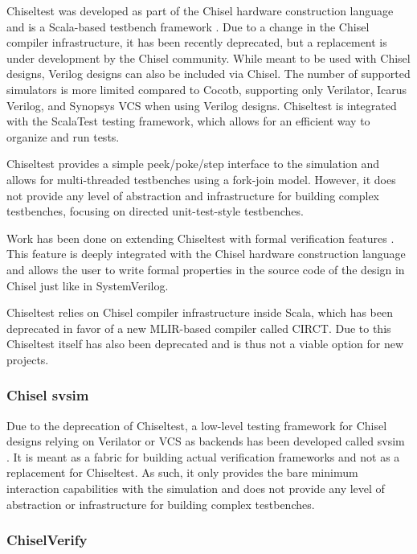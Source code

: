 Chiseltest was developed as part of the Chisel hardware construction language \cite{chiselpaper} and is a Scala-based testbench
framework \cite{chiseltest}. Due to a change in the Chisel compiler infrastructure, it has been recently deprecated,
but a replacement is under development by the Chisel community. While meant to be used with Chisel designs, Verilog
designs can also be included via Chisel. The number of supported simulators is more limited compared to Cocotb,
supporting only Verilator, Icarus Verilog, and Synopsys VCS when using Verilog designs. Chiseltest is integrated with
the ScalaTest testing framework, which allows for an efficient way to organize and run tests.

Chiseltest provides a simple peek/poke/step interface to the simulation and allows for multi-threaded testbenches
using a fork-join model. However, it does not provide any
level of abstraction and infrastructure for building complex
testbenches, focusing on directed unit-test-style testbenches.

Work has been done on extending Chiseltest with formal verification features \cite{laeufer2021open}. This feature is
deeply integrated with the Chisel hardware construction language and allows the user to write formal properties in
the source code of the design in Chisel just like in SystemVerilog.

Chiseltest relies on Chisel compiler infrastructure inside Scala, which has been deprecated in favor of a new MLIR-based compiler called CIRCT. Due to this Chiseltest itself has also been deprecated and is thus not a viable option for new projects.


\subsubsection{Chisel svsim}

Due to the deprecation of Chiseltest, a low-level testing framework for Chisel designs relying on Verilator or VCS as backends has been developed called svsim \cite{svsim}. It is meant as a fabric for building actual verification frameworks and not as a replacement for Chiseltest. As such, it only provides the bare minimum interaction capabilities with the simulation and does not provide any level of abstraction or infrastructure for building complex testbenches.


\subsubsection{ChiselVerify} %

